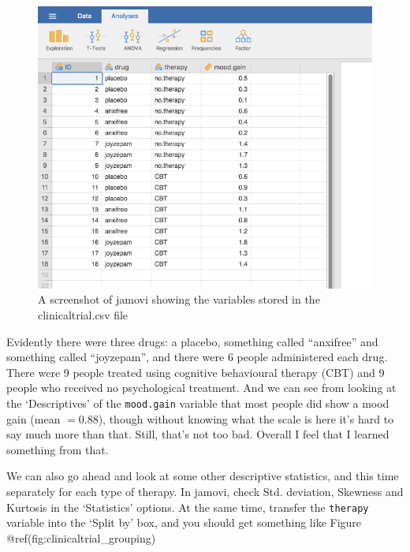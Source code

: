 \documentclass[
]{book}
\begin{document}
\begin{figure}
\includegraphics[width=9.35in]{img/descriptives/clinicaltrial} \caption{A screenshot of jamovi showing the variables stored in the clinicaltrial.csv file}\label{fig:clinicaltrial}
\end{figure}

Evidently there were three drugs: a placebo, something called ``anxifree'' and something called ``joyzepam'', and there were 6 people administered each drug. There were 9 people treated using cognitive behavioural therapy (CBT) and 9 people who received no psychological treatment. And we can see from looking at the `Descriptives' of the \texttt{mood.gain} variable that most people did show a mood gain (mean \(=0.88\)), though without knowing what the scale is here it's hard to say much more than that. Still, that's not too bad. Overall I feel that I learned something from that.

We can also go ahead and look at some other descriptive statistics, and this time separately for each type of therapy. In jamovi, check Std. deviation, Skewness and Kurtosis in the `Statistics' options. At the same time, transfer the \texttt{therapy} variable into the `Split by' box, and you should get something like Figure @ref(fig:clinicaltrial\_grouping)
\end{document}

